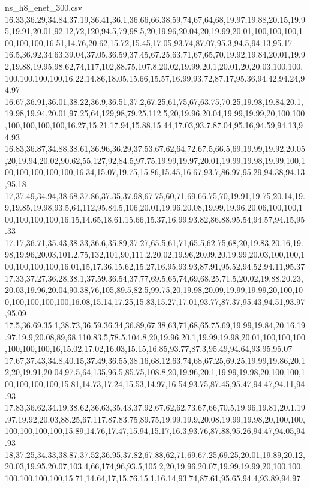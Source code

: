 \begin{filecontents*}[overwrite]{ns_h8_enet_300.csv}
16.33,36.29,34.84,37.19,36.41,36.1,36.66,66.38,59,74,67,64,68,19.97,19.88,20.15,19.95,19.91,20.01,92.12,72,120,94.5,79,98.5,20,19.96,20.04,20,19.99,20.01,100,100,100,100,100,100,16.51,14.76,20.62,15.72,15.45,17.05,93.74,87.07,95.3,94.5,94.13,95.17
16.5,36.92,34.63,39.04,37.05,36.59,37.45,67.25,63,71,67,65,70,19.92,19.84,20.01,19.92,19.88,19.95,98.62,74,117,102,88.75,107.8,20.02,19.99,20.1,20.01,20,20.03,100,100,100,100,100,100,16.22,14.86,18.05,15.66,15.57,16.99,93.72,87.17,95.36,94.42,94.24,94.97
16.67,36.91,36.01,38.22,36.9,36.51,37.2,67.25,61,75,67,63.75,70.25,19.98,19.84,20.1,19.98,19.94,20.01,97.25,64,129,98,79.25,112.5,20,19.96,20.04,19.99,19.99,20,100,100,100,100,100,100,16.27,15.21,17.94,15.88,15.44,17.03,93.7,87.04,95.16,94.59,94.13,94.93
16.83,36.87,34.88,38.61,36.96,36.29,37.53,67.62,64,72,67.5,66.5,69,19.99,19.92,20.05,20,19.94,20.02,90.62,55,127,92,84.5,97.75,19.99,19.97,20.01,19.99,19.98,19.99,100,100,100,100,100,100,16.34,15.07,19.75,15.86,15.45,16.67,93.7,86.97,95.29,94.38,94.13,95.18
17,37.49,34.94,38.68,37.86,37.35,37.98,67.75,60,71,69,66.75,70,19.91,19.75,20.14,19.9,19.85,19.98,93.5,64,112,95,84.5,106,20.01,19.96,20.08,19.99,19.96,20.06,100,100,100,100,100,100,16.15,14.65,18.61,15.66,15.37,16.99,93.82,86.88,95.54,94.57,94.15,95.33
17.17,36.71,35.43,38.33,36.6,35.89,37.27,65.5,61,71,65.5,62.75,68,20,19.83,20.16,19.98,19.96,20.03,101.2,75,132,101,90,111.2,20.02,19.96,20.09,20,19.99,20.03,100,100,100,100,100,100,16.01,15,17.36,15.62,15.27,16.95,93.93,87.91,95.52,94.52,94.11,95.37
17.33,37.27,36.28,38.1,37.59,36.54,37.77,69.5,65,74,69,68.25,71.5,20.02,19.88,20.23,20.03,19.96,20.04,90.38,76,105,89.5,82.5,99.75,20,19.98,20.09,19.99,19.99,20,100,100,100,100,100,100,16.08,15.14,17.25,15.83,15.27,17.01,93.77,87.37,95.43,94.51,93.97,95.09
17.5,36.69,35.1,38.73,36.59,36.34,36.89,67.38,63,71,68,65.75,69,19.99,19.84,20.16,19.97,19.9,20.08,89,68,110,83.5,78.5,104.8,20,19.96,20.1,19.99,19.98,20.01,100,100,100,100,100,100,16,15.02,17.02,16.03,15.15,16.85,93.77,87.3,95.49,94.64,93.95,95.07
17.67,37.43,34.8,40.15,37.49,36.55,38.16,68.12,63,74,68,67.25,69.25,19.99,19.86,20.12,20,19.91,20.04,97.5,64,135,96.5,85.75,108.8,20,19.96,20.1,19.99,19.98,20,100,100,100,100,100,100,15.81,14.73,17.24,15.53,14.97,16.54,93.75,87.45,95.47,94.47,94.11,94.93
17.83,36.62,34.19,38.62,36.63,35.43,37.92,67.62,62,73,67,66,70.5,19.96,19.81,20.1,19.97,19.92,20.03,88.25,67,117,87,83.75,89.75,19.99,19.9,20.08,19.99,19.98,20,100,100,100,100,100,100,15.89,14.76,17.47,15.94,15.17,16.3,93.76,87.88,95.26,94.47,94.05,94.93
18,37.25,34.33,38.87,37.52,36.95,37.82,67.88,62,71,69,67.25,69.25,20.01,19.89,20.12,20.03,19.95,20.07,103.4,66,174,96,93.5,105.2,20,19.96,20.07,19.99,19.99,20,100,100,100,100,100,100,15.71,14.64,17,15.76,15.1,16.14,93.74,87.61,95.65,94.4,93.89,94.97

\end{filecontents*}
